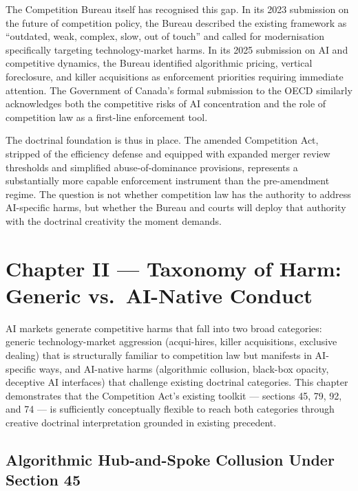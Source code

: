 The Competition Bureau itself has recognised this gap. In its 2023 submission on the future of competition policy, the Bureau described the existing framework as ``outdated, weak, complex, slow, out of touch'' and called for modernisation specifically targeting technology-market harms. In its 2025 submission on AI and competitive dynamics, the Bureau identified algorithmic pricing, vertical foreclosure, and killer acquisitions as enforcement priorities requiring immediate attention. The Government of Canada's formal submission to the OECD similarly acknowledges both the competitive risks of AI concentration and the role of competition law as a first-line enforcement tool.

The doctrinal foundation is thus in place. The amended Competition Act, stripped of the efficiency defense and equipped with expanded merger review thresholds and simplified abuse-of-dominance provisions, represents a substantially more capable enforcement instrument than the pre-amendment regime. The question is not whether competition law has the authority to address AI-specific harms, but whether the Bureau and courts will deploy that authority with the doctrinal creativity the moment demands.


\section{Chapter II --- Taxonomy of Harm: Generic vs.\ AI-Native Conduct}
\label{ch:taxonomy}

AI markets generate competitive harms that fall into two broad categories: generic technology-market aggression (acqui-hires, killer acquisitions, exclusive dealing) that is structurally familiar to competition law but manifests in AI-specific ways, and AI-native harms (algorithmic collusion, black-box opacity, deceptive AI interfaces) that challenge existing doctrinal categories. This chapter demonstrates that the Competition Act's existing toolkit --- sections 45, 79, 92, and 74 --- is sufficiently conceptually flexible to reach both categories through creative doctrinal interpretation grounded in existing precedent.

\subsection{Algorithmic Hub-and-Spoke Collusion Under Section 45}

